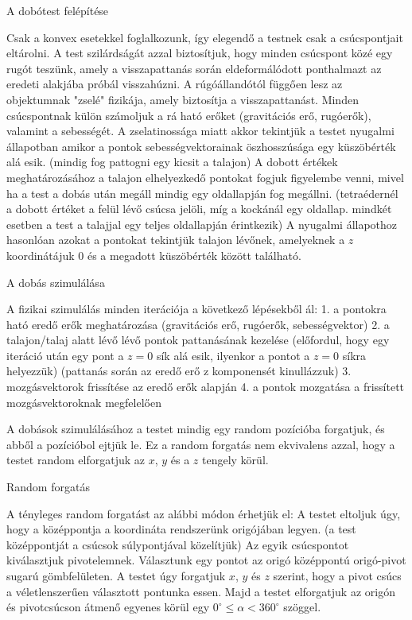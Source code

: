 
A dobótest felépítése

Csak a konvex esetekkel foglalkozunk, így elegendő a testnek csak a csúcspontjait eltárolni.
A test szilárdságát azzal biztosítjuk, hogy minden csúcspont közé egy rugót teszünk, amely a visszapattanás során eldeformálódott ponthalmazt az eredeti alakjába próbál visszahúzni.
A rúgóállandótól függően lesz az objektumnak "zselé" fizikája, amely biztosítja a visszapattanást.
Minden csúcspontnak külön számoljuk a rá ható erőket (gravitációs erő, rugóerők), valamint a sebességét.
A zselatinossága miatt akkor tekintjük a testet nyugalmi állapotban amikor a pontok sebességvektorainak öszhosszúsága egy küszöbérték alá esik. (mindig fog pattogni egy kicsit a talajon)
A dobott értékek meghatározásához a talajon elhelyezkedő pontokat fogjuk figyelembe venni, mivel ha a test a dobás után megáll mindig egy oldallapján fog megállni. (tetraédernél a dobott értéket a felül lévő csúcsa jelöli, míg a kockánál egy oldallap. mindkét esetben a test a talajjal egy teljes oldallapján érintkezik)
A nyugalmi állapothoz hasonlóan azokat a pontokat tekintjük talajon lévőnek, amelyeknek a $z$ koordinátájuk $0$ és a megadott küszöbérték között található.


A dobás szimulálása

A fizikai szimulálás minden iterációja a következő lépésekből ál:
1. a pontokra ható eredő erők meghatározása
(gravitációs erő, rugóerők, sebességvektor)
2. a talajon/talaj alatt lévő lévő pontok pattanásának kezelése
(előfordul, hogy egy iteráció után egy pont a $z=0$ sík alá esik, ilyenkor a pontot a $z=0$ síkra helyezzük)
(pattanás során az eredő erő z komponensét kinullázzuk)
3. mozgásvektorok frissítése az eredő erők alapján
4. a pontok mozgatása a frissített mozgásvektoroknak megfelelően

A dobások szimulálásához a testet mindig egy random pozícióba forgatjuk, és abből a pozícióbol ejtjük le.
Ez a random forgatás nem ekvivalens azzal, hogy a testet random elforgatjuk az $x$, $y$ és a $z$ tengely körül.


Random forgatás

A tényleges random forgatást az alábbi módon érhetjük el:
A testet eltoljuk úgy, hogy a középpontja a koordináta rendszerünk origójában legyen. (a test középpontját a csúcsok súlypontjával közelítjük)
Az egyik csúcspontot kiválasztjuk pivotelemnek.
Választunk egy pontot az origó középpontú origó-pivot sugarú gömbfelületen.
A testet úgy forgatjuk $x$, $y$ és $z$ szerint, hogy a pivot csúcs a véletlenszerűen választott pontunka essen.
Majd a testet elforgatjuk az origón és pivotcsúcson átmenő egyenes körül egy $0^\circ \leq \alpha < 360^\circ$ szöggel.


